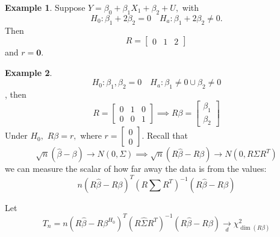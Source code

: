 \documentclass[10pt, oneside]{article}
\theoremstyle{definition}
\newtheorem{exmp}{Example}[section]
\begin{document}
\begin{exmp}
Suppose $Y = \beta_0 + \beta_1 X_1 + \beta_2 + U,$ with 
    \[H_0:\beta_1 + 2\beta_2 = 0 \quad H_a: \beta_1 + 2\beta_2 \neq 0.\] Then 
    \[R = \begin{bmatrix}
        0 & 1 & 2
    \end{bmatrix}\] and $r = \textbf{0}.$
\end{exmp}

    \begin{exmp}
       \[ H_0: \beta_1, \beta_2 = 0 \quad H_a: \beta_1 \neq 0 \cup \beta_2 \neq 0\], then 
       \[R = \begin{bmatrix}
           0 &1 & 0\\
           0 & 0 & 1
       \end{bmatrix} \implies R\beta = \begin{bmatrix}
           \beta_1 \\ \beta_2
       \end{bmatrix}\] Under $H_0,$ $R\beta = r,$ where $r = \begin{bmatrix}
            0 \\ 0
       \end{bmatrix}$. Recall that 
       \[\sqrt{n}(\hat{\beta} - \beta) \to N(0, \Sigma) \implies \sqrt{n}(R\hat{\beta} - R\beta) \to N(0, R \Sigma R^T)\] we can measure the scalar of how far away the data is from the values:
       \[n(R\hat\beta - R\beta)^T(R\sum R^T)^{-1}(R\hat\beta - R\beta)\]
    \end{exmp}

    Let 
    \[T_n = n(R\hat\beta - R\beta^{H_0})^T(R \hat\Sigma R^T)^{-1}(R\hat\beta - R\beta) \xrightarrow[d]{}\chi^2_{\dim (R\beta)}\]
\end{document}
